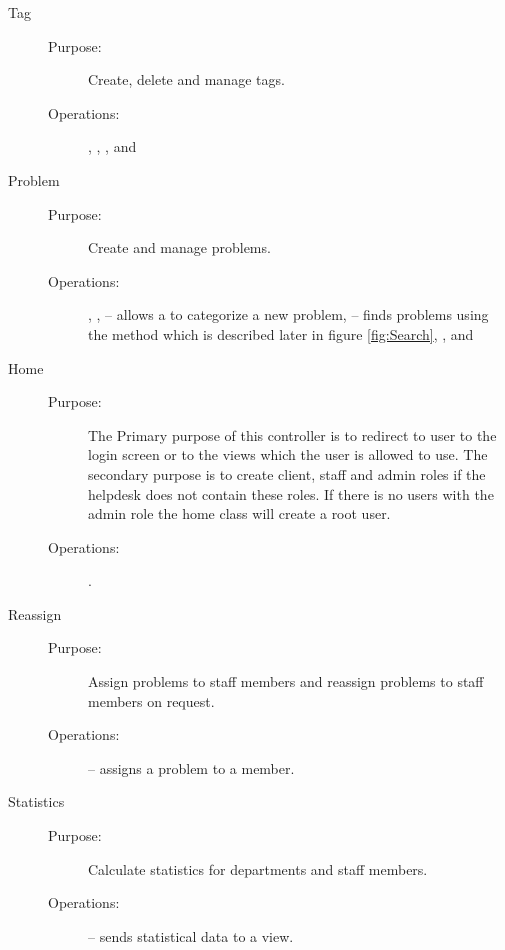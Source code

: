 \begin{description}
\item[Tag]\hfill
\begin{description}
\item[Purpose:]Create, delete and manage tags.
\item[Operations:], , , and 
\end{description}
\end{description}

\begin{description}
\item[Problem]\hfill
\begin{description}
\item[Purpose:]Create and manage problems.
\item[Operations:], ,  -- allows a \aclient[] to categorize a new problem,  -- finds problems using the  method which is described later in figure \ref{fig:Search}, , and 
\end{description}
\end{description}

\begin{description}
\item[Home]\hfill
\begin{description}
\item[Purpose:]The Primary purpose of this controller is to redirect to user to the login screen or to the views which the user is allowed to use.
The secondary purpose is to create client, staff and admin roles if the helpdesk does not contain these roles.
If there is no users with the admin role the home class will create a root user.
\item[Operations:].
\end{description}
\end{description}

\begin{description}
\item[Reassign]\hfill
\begin{description}
\item[Purpose:]Assign problems to staff members and reassign problems to staff members on request.
\item[Operations:] -- assigns a problem to a \astaff[] member.
\end{description}
\end{description}

\begin{description}
\item[Statistics]\hfill
\begin{description}
\item[Purpose:]Calculate statistics for departments and staff members.
\item[Operations:] -- sends statistical data to a view.
\end{description}
\end{description}